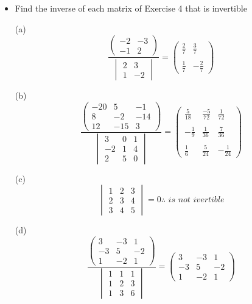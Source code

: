 \documentclass[10pt]{extarticle}
\newcommand{\itembf}[1]{\item[\textbf{#1}]}
\begin{document}
\begin{itemize}
	\itembf{5.}	Find the inverse of each matrix of Exercise 4 that is invertible
		
			(a)\[\frac{	\begin{pmatrix}
					-2&-3 \\
					-1&2
			\end{pmatrix}}{\begin{vmatrix}
			2&3 \\
			1&-2
		\end{vmatrix}}=\begin{pmatrix}
	\frac{2}{7}&\frac{3}{7} \\ \\
	\frac{1}{7}&-\frac{2}{7}
\end{pmatrix}\]
		
			(b)\[\frac{\begin{pmatrix}
					-20&5&-1 \\
					8&-2&-14\\
					12&-15&3
			\end{pmatrix}}{\begin{vmatrix}
			3&0&1 \\
			-2&1&4\\
			2&5&0
		\end{vmatrix}}=\begin{pmatrix}
\frac{5}{18}&\frac{-5}{72}&\frac{1}{72} \\ \\
-\frac{1}{9}&\frac{1}{36}&\frac{7}{36}\\ \\
\frac{1}{6}&\frac{5}{24}&-\frac{1}{24}
\end{pmatrix}\]
		
			(c)\[\begin{vmatrix}
			1&2&3 \\
			2&3&4\\
			3&4&5
		\end{vmatrix}=0\therefore \textit{ is not ivertible}\]
		
		
		(d)\[\frac{\begin{pmatrix}
				3&-3&1 \\
				-3&5&-2\\
				1&-2&1
		\end{pmatrix}}{\begin{vmatrix}
		1&1&1 \\
		1&2&3\\
		1&3&6
	\end{vmatrix}}=\begin{pmatrix}
3&-3&1 \\
-3&5&-2\\
1&-2&1
\end{pmatrix}\]
		

\end{itemize}
\end{document}
